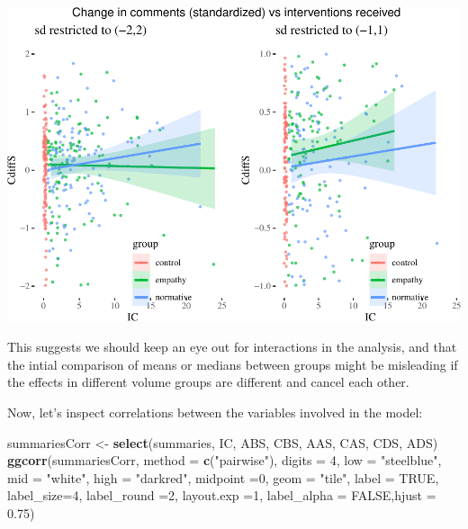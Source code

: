 \documentclass[10pt,dvipsnames,enabledeprecatedfontcommands]{scrartcl}
\newenvironment{Shaded}{\begin{snugshade}}{\end{snugshade}}
\newcommand{\KeywordTok}[1]{\textcolor[rgb]{0.13,0.29,0.53}{\textbf{#1}}}
\newcommand{\DataTypeTok}[1]{\textcolor[rgb]{0.13,0.29,0.53}{#1}}
\newcommand{\DecValTok}[1]{\textcolor[rgb]{0.00,0.00,0.81}{#1}}
\newcommand{\FloatTok}[1]{\textcolor[rgb]{0.00,0.00,0.81}{#1}}
\newcommand{\StringTok}[1]{\textcolor[rgb]{0.31,0.60,0.02}{#1}}
\newcommand{\OtherTok}[1]{\textcolor[rgb]{0.56,0.35,0.01}{#1}}
\newcommand{\NormalTok}[1]{#1}
\begin{document}
\begin{center}\includegraphics[width=1\linewidth]{bayesianReport3_files/figure-latex/icc-1} \end{center}

\normalsize

This suggests we should keep an eye out for interactions in the
analysis, and that the intial comparison of means or medians between
groups might be misleading if the effects in different volume groups are
different and cancel each other.

Now, let's inspect correlations between the variables involved in the
model:

\vspace{1mm} \footnotesize

\begin{Shaded}
\begin{Highlighting}[]
\NormalTok{summariesCorr <-}\StringTok{ }\KeywordTok{select}\NormalTok{(summaries, IC, ABS, CBS, AAS, CAS, CDS, ADS)}
\KeywordTok{ggcorr}\NormalTok{(summariesCorr, }\DataTypeTok{method =} \KeywordTok{c}\NormalTok{(}\StringTok{"pairwise"}\NormalTok{),}
       \DataTypeTok{digits =} \DecValTok{4}\NormalTok{, }\DataTypeTok{low =} \StringTok{"steelblue"}\NormalTok{, }\DataTypeTok{mid =} \StringTok{"white"}\NormalTok{,}
       \DataTypeTok{high =} \StringTok{"darkred"}\NormalTok{, }\DataTypeTok{midpoint =}\DecValTok{0}\NormalTok{,}
       \DataTypeTok{geom =} \StringTok{"tile"}\NormalTok{, }\DataTypeTok{label =} \OtherTok{TRUE}\NormalTok{, }\DataTypeTok{label_size=}\DecValTok{4}\NormalTok{, }\DataTypeTok{label_round =}\DecValTok{2}\NormalTok{, }\DataTypeTok{layout.exp =}\DecValTok{1}\NormalTok{,}
       \DataTypeTok{label_alpha =} \OtherTok{FALSE}\NormalTok{,}\DataTypeTok{hjust =} \FloatTok{0.75}\NormalTok{)}
\end{Highlighting}
\end{Shaded}
\end{document}
